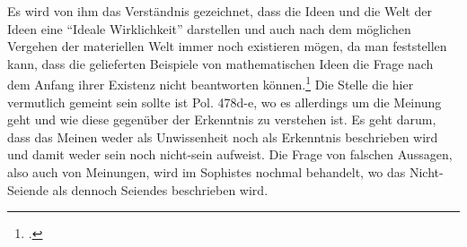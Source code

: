 Es wird von ihm das Verständnis gezeichnet, dass die Ideen und die Welt der Ideen eine \enquote{Ideale Wirklichkeit} darstellen und auch nach dem möglichen Vergehen der materiellen Welt immer noch existieren mögen, da man feststellen kann, dass die gelieferten Beispiele von mathematischen Ideen die Frage nach dem Anfang ihrer Existenz nicht beantworten können.\footcite[vgl.][S. 99]{Hirschberger} 
Die Stelle die hier vermutlich gemeint sein sollte ist Pol. 478d-e, wo es allerdings um die Meinung geht und wie diese gegenüber der Erkenntnis zu verstehen ist. Es geht darum, dass das Meinen weder als Unwissenheit noch als Erkenntnis beschrieben wird und damit weder sein noch nicht-sein aufweist. Die Frage von falschen Aussagen, also auch von Meinungen, wird im Sophistes nochmal behandelt, wo das Nicht-Seiende als dennoch Seiendes beschrieben wird. 







